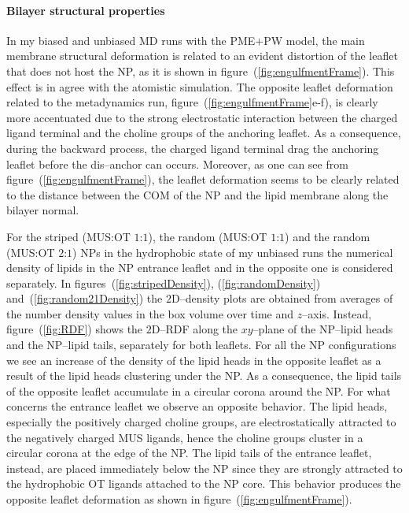 \paragraph{\textbf{Bilayer structural properties}}
In my biased and unbiased \ac{MD} runs with the \martini{} \ac{PME}$+$\ac{PW} model, the main membrane structural 
deformation is related to an evident distortion of the leaflet that does not host the \ac{NP}, as it is shown in 
figure~(\ref{fig:engulfmentFrame}). This effect is in agree with the atomistic simulation. The opposite leaflet 
deformation related to the metadynamics run, figure~(\ref{fig:engulfmentFrame}e-f), is clearly more accentuated 
due to the strong electrostatic interaction between the charged ligand terminal and the choline groups of the 
anchoring leaflet. As a consequence, during the backward process, the charged ligand terminal drag the anchoring 
leaflet before the dis--anchor can occurs. Moreover, as one can see from figure~(\ref{fig:engulfmentFrame}), the 
leaflet deformation seems to be clearly related to the distance between the \ac{COM} of the \ac{NP} and the lipid 
membrane along the bilayer normal.

For the striped (\ac{MUS}:\ac{OT} $1$:$1$), the random (\ac{MUS}:\ac{OT} $1$:$1$) and the random (\ac{MUS}:\ac{OT} 
$2$:$1$) \acp{NP} in the hydrophobic state of my unbiased runs the numerical density of lipids in the \ac{NP} 
entrance leaflet and in the opposite one is considered separately. In figures~(\ref{fig:stripedDensity}), 
(\ref{fig:randomDensity}) and~(\ref{fig:random21Density}) the $2$D--density plots are obtained from averages of 
the number density values in the box volume over time and $z$--axis. Instead, figure~(\ref{fig:RDF}) shows the 
$2$D--\ac{RDF} along the $xy$--plane of the \ac{NP}--lipid heads and the \ac{NP}--lipid tails, separately for both 
leaflets. For all the \ac{NP} configurations we see an increase of the density of the lipid heads in the opposite 
leaflet as a result of the lipid heads clustering under the \ac{NP}. As a consequence, the lipid tails of the 
opposite leaflet accumulate in a circular corona around the \ac{NP}. For what concerns the entrance leaflet we 
observe an opposite behavior. The lipid heads, especially the positively charged choline groups, are 
electrostatically attracted to the negatively charged \ac{MUS} ligands, hence the choline groups cluster in a 
circular corona at the edge of the \ac{NP}. The lipid tails of the entrance leaflet, instead, are placed 
immediately below the \ac{NP} since they are strongly attracted to the hydrophobic \ac{OT} ligands attached to the 
\ac{NP} core. This behavior produces the opposite leaflet deformation as shown in 
figure~(\ref{fig:engulfmentFrame}).


